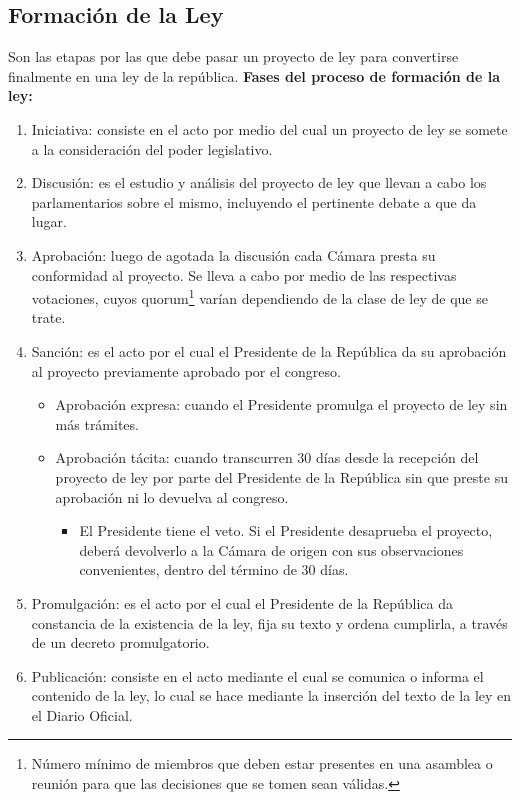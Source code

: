 \documentclass{templateApunte}
\begin{document}
\subsection{Formación de la Ley}
Son las etapas por las que debe pasar un proyecto de ley para convertirse finalmente en una ley de la república.
\newline
\textbf{Fases del proceso de formación de la ley:}
\begin{enumerate}
  \item Iniciativa: consiste en el acto por medio del cual un proyecto de ley se somete a la consideración del poder legislativo.
  
  \item Discusión: es el estudio y análisis del proyecto de ley que llevan a cabo los parlamentarios sobre el mismo, incluyendo el pertinente debate a que da lugar.
  
  \item Aprobación: luego de agotada la discusión cada Cámara presta su conformidad al proyecto. Se lleva a cabo por medio de las respectivas votaciones, cuyos quorum\footnote{Número mínimo de miembros que deben estar presentes en una asamblea o reunión para que las decisiones que se tomen sean válidas.} varían dependiendo de la clase de ley de que se trate.
  
  \item Sanción: es el acto por el cual el Presidente de la República da su aprobación al proyecto previamente aprobado por el congreso.
  \begin{itemize}
    \item Aprobación expresa: cuando el Presidente promulga el proyecto de ley sin m\'as trámites.
    
    \item Aprobación tácita: cuando transcurren 30 días desde la recepción del proyecto de ley por parte del Presidente de la República sin que preste su aprobación ni lo devuelva al congreso.
    \begin{itemize}
      \item El Presidente tiene el veto. Si el Presidente desaprueba el proyecto, deberá devolverlo a la Cámara de origen con sus observaciones convenientes, dentro del término de 30 días.
    \end{itemize}
  \end{itemize}  
  
  \item Promulgación: es el acto por el cual el Presidente de la República da constancia de la existencia de la ley, fija su texto y ordena cumplirla, a través de un decreto promulgatorio.
  
  \item Publicación: consiste en el acto mediante el cual se comunica o informa el contenido de la ley, lo cual se hace mediante la inserción del texto de la ley en el Diario Oficial.
\end{enumerate}
\end{document}

